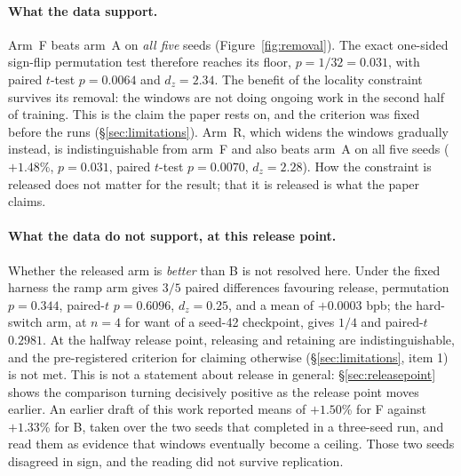 \documentclass[11pt,a4paper]{article}
\begin{document}
\paragraph{What the data support.} Arm~F beats arm~A on \emph{all five} seeds (Figure~\ref{fig:removal}). The exact one-sided sign-flip permutation test therefore reaches its floor, $p = 1/32 = 0.031$, with paired $t$-test $p = 0.0064$ and $d_z = 2.34$. The benefit of the locality constraint survives its removal: the windows are not doing ongoing work in the second half of training. This is the claim the paper rests on, and the criterion was fixed before the runs (\S\ref{sec:limitations}). Arm~R, which widens the windows gradually instead, is indistinguishable from arm~F and also beats arm~A on all five seeds ($+1.48$\%, $p = 0.031$, paired $t$-test $p = 0.0070$, $d_z = 2.28$). How the constraint is released does not matter for the result; that it is released is what the paper claims.

\paragraph{What the data do not support, at this release point.} Whether the released arm is \emph{better} than B is not resolved here. Under the fixed harness the ramp arm gives $3/5$ paired differences favouring release, permutation $p=0.344$, paired-$t$ $p = 0.6096$, $d_z = 0.25$, and a mean of $+0.0003$ bpb; the hard-switch arm, at $n=4$ for want of a seed-42 checkpoint, gives $1/4$ and paired-$t$ $0.2981$. At the halfway release point, releasing and retaining are indistinguishable, and the pre-registered criterion for claiming otherwise (\S\ref{sec:limitations}, item 1) is not met. This is not a statement about release in general: \S\ref{sec:releasepoint} shows the comparison turning decisively positive as the release point moves earlier. An earlier draft of this work reported means of $+1.50$\% for F against $+1.33$\% for B, taken over the two seeds that completed in a three-seed run, and read them as evidence that windows eventually become a ceiling. Those two seeds disagreed in sign, and the reading did not survive replication.
\end{document}
